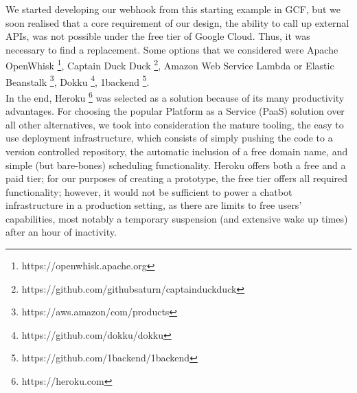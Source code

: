 We started developing our webhook from this starting example in GCF, but we soon realised that a core requirement of our design, the ability to call up external APIs, was not possible under the free tier of Google Cloud. Thus, it was necessary to find a replacement. Some options that we considered were Apache OpenWhisk \footnote{https://openwhisk.apache.org}, Captain Duck Duck \footnote{https://github.com/githubsaturn/captainduckduck}, Amazon Web Service Lambda or Elastic Beanstalk \footnote{https://aws.amazon/com/products}, Dokku \footnote{https://github.com/dokku/dokku}, 1backend \footnote{https://github.com/1backend/1backend}. \\
In the end, Heroku \footnote{https://heroku.com} was selected as a solution because of its many productivity advantages. For choosing the popular Platform as a Service (PaaS) solution over all other alternatives, we took into consideration the mature tooling, the easy to use deployment infrastructure, which consists of simply pushing the code to a version controlled repository, the automatic inclusion of a free domain name, and simple (but bare-bones) scheduling functionality. Heroku offers both a free and a paid tier; for our purposes of creating a prototype, the free tier offers all required functionality; however, it would not be sufficient to power a chatbot infrastructure in a production setting, as there are limits to free users' capabilities, most notably a temporary suspension (and extensive wake up times) after an hour of inactivity.

